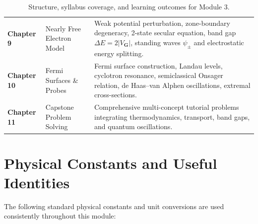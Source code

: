 \documentclass[11pt,a4paper]{article}
\newcommand{\vb}[1]{\mathbf{#1}}
\begin{document}
\begin{table}[ht]
\begin{tabular}{p{2.2cm} p{5.0cm} p{8.2cm}}
\textbf{Chapter 9} & Nearly Free Electron Model & Weak potential perturbation, zone-boundary degeneracy, 2-state secular equation, band gap $\Delta E = 2|V_{\vb{G}}|$, standing waves $\psi_\pm$ and electrostatic energy splitting. \\
\textbf{Chapter 10} & Fermi Surfaces \& Probes & Fermi surface construction, Landau levels, cyclotron resonance, semiclassical Onsager relation, de Haas--van Alphen oscillations, extremal cross-sections. \\
\textbf{Chapter 11} & Capstone Problem Solving & Comprehensive multi-concept tutorial problems integrating thermodynamics, transport, band gaps, and quantum oscillations. \\
\bottomrule
\end{tabular}
\caption{Structure, syllabus coverage, and learning outcomes for Module 3.}
\label{tab:syllabus_map}
\end{table}

\clearpage

\tableofcontents
\clearpage

\section{Physical Constants and Useful Identities}
\label{sec:constants}

The following standard physical constants and unit conversions are used consistently throughout this module:
\end{document}
